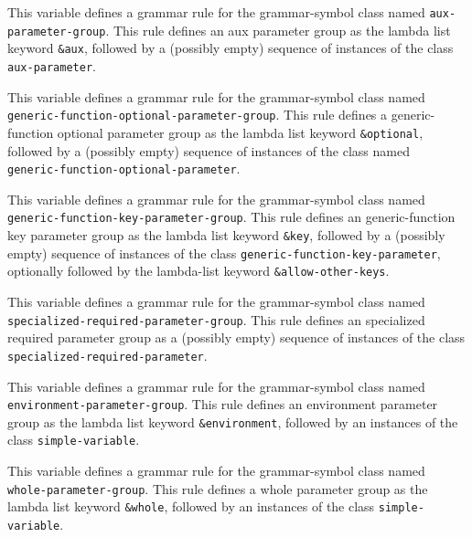 
This variable defines a grammar rule for the grammar-symbol class
named \texttt{aux-parameter-group}.  This rule defines an aux
parameter group as the lambda list keyword \texttt{\&aux}, followed by
a (possibly empty) sequence of instances of the class
\texttt{aux-parameter}.


This variable defines a grammar rule for the grammar-symbol class
named \texttt{generic-function-optional-parameter-group}.  This rule
defines a generic-function optional parameter group as the lambda list
keyword \texttt{\&optional}, followed by a (possibly empty) sequence
of instances of the class named\\
\texttt{generic-function-optional-parameter}.


This variable defines a grammar rule for the grammar-symbol class
named \texttt{generic-function-key-parameter-group}.  This rule
defines an generic-function key parameter group as the lambda list
keyword \texttt{\&key}, followed by a (possibly empty) sequence of
instances of the class \texttt{generic-function-key-parameter},
optionally followed by the lambda-list keyword
\texttt{\&allow-other-keys}.


This variable defines a grammar rule for the grammar-symbol class
named \texttt{specialized-required-parameter-group}.  This rule
defines an specialized required parameter group as a (possibly empty)
sequence of instances of the class
\texttt{specialized-required-parameter}.


This variable defines a grammar rule for the grammar-symbol class
named \texttt{environment-parameter-group}.  This rule defines an
environment parameter group as the lambda list keyword
\texttt{\&environment}, followed by an instances of the class
\texttt{simple-variable}.


This variable defines a grammar rule for the grammar-symbol class
named \texttt{whole-parameter-group}.  This rule defines a whole
parameter group as the lambda list keyword \texttt{\&whole}, followed
by an instances of the class \texttt{simple-variable}.

